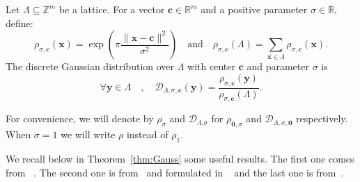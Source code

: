 \documentclass[runningheads,10pt]{llncs}
\def\ZZ{\mathbb{Z}}
\def\RR{\mathbb{R}}
\def\cal{\mathcal}
\def\bf{\mathbf}
\def\x{\bf{x}}
\def\L{\Lambda}
\def\c{\bf{c}}
\begin{document}
\begin{definition}
	Let $\L\subseteq\ZZ^m$ be a lattice. For a vector $\bf{c}\in\RR^m$ and a positive parameter $\sigma\in\RR$, define:
	$$\rho_{\sigma,\c}(\x)=\exp\left(\pi\frac{\|\x-\c\|^2}{\sigma^2}\right)\quad\text{and}\quad
	\rho_{\sigma,\c}(\L)=\sum_{\x\in\L}\rho_{\sigma,\c}(\x).    $$
	The discrete Gaussian distribution over $\L$ with center $\c$ and parameter $\sigma$ is
	$$\forall \bf{y}\in\L\quad,\quad\cal{D}_{\L,\sigma,\c}(\bf{y})=\frac{\rho_{\sigma,\c}(\bf{y})}{\rho_{\sigma,\c}(\L)}.$$
\end{definition}
For convenience, we will denote by $\rho_\sigma$ and $\cal{D}_{\L.\sigma}$ for $\rho_{\bf{0},\sigma}$ and $\cal{D}_{\L,\sigma,\bf{0}}$ respectively. When $\sigma=1$ we will write $\rho$ instead of $\rho_1$. 

We recall below in Theorem~\ref{thm:Gauss} some useful results. The first one comes from~{\cite[Lemma 4.4]{MR04}} . The second one is from~\cite{CHKP10} and formulated in ~{\cite[Theorem 17]{ABB10-EuroCrypt}} and the last one is from~{\cite[Theorem 19]{ABB10-EuroCrypt}}.
\end{document}
